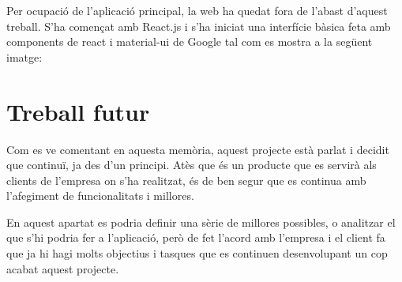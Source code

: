 \documentclass[letterpaper,11pt,catalan]{sphinxmanual}
\begin{document}

\begin{DUlineblock}{0em}
\item[] 
\item[] 
\item[] 
\end{DUlineblock}

Per ocupació de l'aplicació principal, la web ha quedat fora de l'abast d'aquest treball. S'ha començat amb React.js i
s'ha iniciat una interfície bàsica feta amb components de react i material-ui de Google tal com es mostra a la següent imatge:



\chapter{Treball futur}
\label{\detokenize{index:treball-futur}}
Com es ve comentant en aquesta memòria, aquest projecte està parlat i decidit que continuï,
ja des d'un principi. Atès que és un producte que es servirà als clients de l'empresa on s'ha realitzat,
és de ben segur que es continua amb l'afegiment de funcionalitats i millores.

En aquest apartat es podria definir una sèrie de millores possibles, o analitzar el que s'hi podria fer a l'aplicació, però de fet l'acord amb l'empresa i el client fa que ja hi hagi molts objectius i tasques que es continuen desenvolupant un cop acabat aquest projecte.
\end{document}
